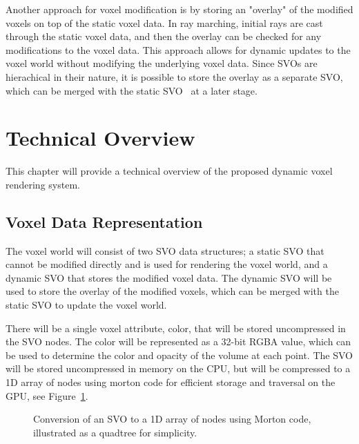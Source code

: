 \documentclass{article}
\begin{document}
Another approach for voxel modification is by storing an "overlay" of the modified voxels on top of the static voxel data. In ray marching, initial rays are cast through the static voxel data, and then the overlay can be checked for any modifications to the voxel data. This approach allows for dynamic updates to the voxel world without modifying the underlying voxel data. Since SVOs are hierachical in their nature, it is possible to store the overlay as a separate SVO, which can be merged with the static SVO~\cite{Douglas_2022} at a later stage.

\section{Technical Overview}
This chapter will provide a technical overview of the proposed dynamic voxel rendering system.

\subsection{Voxel Data Representation}
The voxel world will consist of two SVO data structures; a static SVO that cannot be modified directly and is used for rendering the voxel world, and a dynamic SVO that stores the modified voxel data. The dynamic SVO will be used to store the overlay of the modified voxels, which can be merged with the static SVO to update the voxel world.

There will be a single voxel attribute, color, that will be stored uncompressed in the SVO nodes. The color will be represented as a 32-bit RGBA value, which can be used to determine the color and opacity of the volume at each point. The SVO will be stored uncompressed in memory on the CPU, but will be compressed to a 1D array of nodes using morton code for efficient storage and traversal on the GPU, see Figure~\ref{fig:svo_to_morton}.

\begin{figure}[thp]
    \begin{center}
    \end{center}
    \caption{Conversion of an SVO to a 1D array of nodes using Morton code, illustrated as a quadtree for simplicity.}
    \label{fig:svo_to_morton}
\end{figure}
\end{document}
